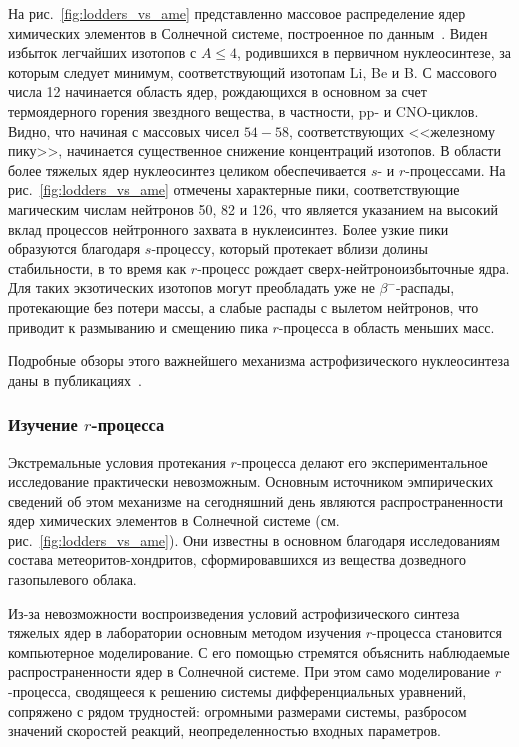 На рис.~\ref{fig:lodders_vs_ame} представленно массовое распределение ядер химических элементов в Солнечной системе, построенное по данным~\cite{lodders2003}. Виден избыток легчайших изотопов с $A \leq 4$, родившихся в первичном нуклеосинтезе, за которым следует минимум, соответствующий изотопам Li, Be и B. С массового числа 12 начинается область ядер, рождающихся в основном за счет термоядерного горения звездного вещества, в частности, pp- и CNO-циклов. Видно, что начиная с массовых чисел $54 - 58$, соответствующих <<железному пику>>, начинается существенное снижение концентраций изотопов. В области более тяжелых ядер нуклеосинтез целиком обеспечивается $s$- и $r$-процессами. На рис.~\ref{fig:lodders_vs_ame} отмечены характерные пики, соответствующие магическим числам нейтронов 50, 82 и 126, что является указанием на высокий вклад процессов нейтронного захвата в нуклеисинтез. Более узкие пики образуются благодаря $s$-процессу, который протекает вблизи долины стабильности, в то время как $r$-процесс рождает сверх-нейтроноизбыточные ядра. Для таких экзотических изотопов могут преобладать уже не $\beta^-$-распады, протекающие без потери массы, а слабые распады с вылетом нейтронов, что приводит к размыванию и смещению пика $r$-процесса в область меньших масс.

Подробные обзоры этого важнейшего механизма астрофизического нуклеосинтеза даны в публикациях~\cite{arnould2007,kajino2019}.

\subsubsection*{Изучение $r$-процесса}
Экстремальные условия протекания $r$-процесса делают его экспериментальное исследование практически невозможным. Основным источником эмпирических сведений об этом механизме на сегодняшний день являются распространенности ядер химических элементов в Солнечной системе (см. рис.~\ref{fig:lodders_vs_ame}). Они известны в основном благодаря исследованиям состава метеоритов-хондритов, сформировавшихся из вещества дозведного газопылевого облака.

Из-за невозможности воспроизведения условий астрофизического синтеза тяжелых ядер в лаборатории основным методом изучения $r$-процесса становится компьютерное моделирование. С его помощью стремятся объяснить наблюдаемые распространенности ядер в Солнечной системе. При этом само моделирование $r$-процесса, сводящееся к решению системы дифференциальных уравнений, сопряжено с рядом трудностей: огромными размерами системы, разбросом значений скоростей реакций, неопределенностью входных параметров.

